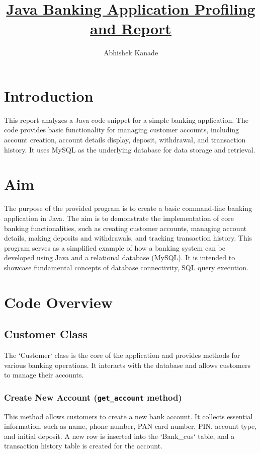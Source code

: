 \documentclass{article}
\title{\textbf{\underline{Java Banking Application Profiling and Report}}}
\author{Abhishek Kanade}
\begin{document}
\maketitle


\section{Introduction}
This report analyzes a Java code snippet for a simple banking application. The code provides basic functionality for managing customer accounts, including account creation, account details display, deposit, withdrawal, and transaction history. It uses MySQL as the underlying database for data storage and retrieval.
\section{Aim}
The purpose of the provided program is to create a basic command-line banking application in Java. The aim is to demonstrate the implementation of core banking functionalities, such as creating customer accounts, managing account details, making deposits and withdrawals, and tracking transaction history. This program serves as a simplified example of how a banking system can be developed using Java and a relational database (MySQL). It is intended to showcase fundamental concepts of database connectivity, SQL query execution.

\section{Code Overview}

\subsection{Customer Class}
The `Customer` class is the core of the application and provides methods for various banking operations. It interacts with the database and allows customers to manage their accounts.

\subsubsection{Create New Account (\texttt{get\_account} method)}
This method allows customers to create a new bank account. It collects essential information, such as name, phone number, PAN card number, PIN, account type, and initial deposit. A new row is inserted into the `Bank\_cus` table, and a transaction history table is created for the account.
\end{document}
